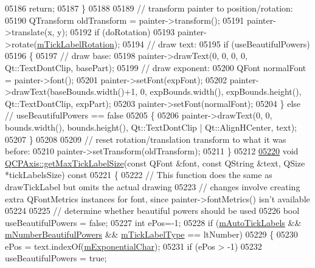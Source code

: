 \begin{DoxyCode}
05186       \textcolor{keywordflow}{return};
05187   \}
05188   
05189   \textcolor{comment}{// transform painter to position/rotation:}
05190   QTransform oldTransform = painter->transform();
05191   painter->translate(x, y);
05192   \textcolor{keywordflow}{if} (doRotation)
05193     painter->rotate(\hyperlink{a00025_a47660c8694884cdb87495bf8b4c8a3b9}{mTickLabelRotation});
05194   \textcolor{comment}{// draw text:}
05195   \textcolor{keywordflow}{if} (useBeautifulPowers)
05196   \{
05197     \textcolor{comment}{// draw base:}
05198     painter->drawText(0, 0, 0, 0, Qt::TextDontClip, basePart);
05199     \textcolor{comment}{// draw exponent:}
05200     QFont normalFont = painter->font();
05201     painter->setFont(expFont);
05202     painter->drawText(baseBounds.width()+1, 0, expBounds.width(), expBounds.height(), Qt::TextDontClip,  
      expPart);
05203     painter->setFont(normalFont);
05204   \} \textcolor{keywordflow}{else} \textcolor{comment}{// useBeautifulPowers == false}
05205   \{
05206     painter->drawText(0, 0, bounds.width(), bounds.height(), Qt::TextDontClip | Qt::AlignHCenter, text);
05207   \}
05208   
05209   \textcolor{comment}{// reset rotation/translation transform to what it was before:}
05210   painter->setTransform(oldTransform);
05211 \}
05212 
\hypertarget{a00115_source_l05220}{}\hyperlink{a00025_aca8025b82a43a4627eb87db9026a69c0}{05220} \textcolor{keywordtype}{void} \hyperlink{a00025_aca8025b82a43a4627eb87db9026a69c0}{QCPAxis::getMaxTickLabelSize}(\textcolor{keyword}{const} QFont &font, \textcolor{keyword}{const} QString &text,  
      QSize *tickLabelsSize)\textcolor{keyword}{ const}
05221 \textcolor{keyword}{}\{
05222   \textcolor{comment}{// This function does the same as drawTickLabel but omits the actual drawing}
05223   \textcolor{comment}{// changes involve creating extra QFontMetrics instances for font, since painter->fontMetrics() isn't
       available}
05224   
05225   \textcolor{comment}{// determine whether beautiful powers should be used}
05226   \textcolor{keywordtype}{bool} useBeautifulPowers = \textcolor{keyword}{false};
05227   \textcolor{keywordtype}{int} ePos=-1;
05228   \textcolor{keywordflow}{if} (\hyperlink{a00025_a721e496b342f272078c5ff84564e472f}{mAutoTickLabels} && \hyperlink{a00025_af03809bee3f3e35fcc38d25b6dd5003b}{mNumberBeautifulPowers} && 
      \hyperlink{a00025_a6e056c1cb1aab0eddebfebbcb78c8f90}{mTickLabelType} == ltNumber)
05229   \{
05230     ePos = text.indexOf(\hyperlink{a00025_a0ec9dbb79704be01f780d34c6f57a08e}{mExponentialChar});
05231     \textcolor{keywordflow}{if} (ePos > -1)
05232       useBeautifulPowers = \textcolor{keyword}{true};

\end{DoxyCode}
